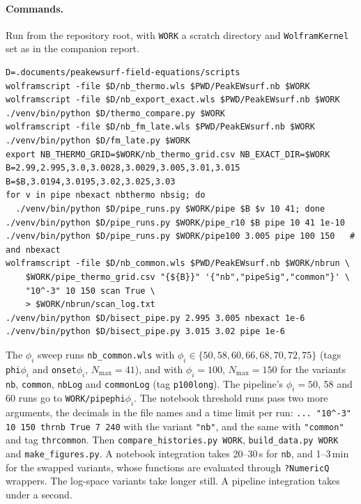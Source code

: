 \documentclass[11pt,a4paper]{article}
\newcommand{\code}[1]{\texttt{#1}}
\begin{document}
\paragraph{Commands.} Run from the repository root, with \code{WORK} a scratch directory and
\code{WolframKernel} set as in the companion report.
{\small
\begin{verbatim}
D=.documents/peakewsurf-field-equations/scripts
wolframscript -file $D/nb_thermo.wls $PWD/PeakEWsurf.nb $WORK
wolframscript -file $D/nb_export_exact.wls $PWD/PeakEWsurf.nb $WORK
./venv/bin/python $D/thermo_compare.py $WORK
wolframscript -file $D/nb_fm_late.wls $PWD/PeakEWsurf.nb $WORK
./venv/bin/python $D/fm_late.py $WORK
export NB_THERMO_GRID=$WORK/nb_thermo_grid.csv NB_EXACT_DIR=$WORK
B=2.99,2.995,3.0,3.0028,3.0029,3.005,3.01,3.015
B=$B,3.0194,3.0195,3.02,3.025,3.03
for v in pipe nbexact nbthermo nbsig; do
  ./venv/bin/python $D/pipe_runs.py $WORK/pipe $B $v 10 41; done
./venv/bin/python $D/pipe_runs.py $WORK/pipe_r10 $B pipe 10 41 1e-10
./venv/bin/python $D/pipe_runs.py $WORK/pipe100 3.005 pipe 100 150   # and nbexact
wolframscript -file $D/nb_common.wls $PWD/PeakEWsurf.nb $WORK/nbrun \
    $WORK/pipe_thermo_grid.csv "{${B}}" '{"nb","pipeSig","common"}' \
    "10^-3" 10 150 scan True \
    > $WORK/nbrun/scan_log.txt
./venv/bin/python $D/bisect_pipe.py 2.995 3.005 nbexact 1e-6
./venv/bin/python $D/bisect_pipe.py 3.015 3.02 pipe 1e-6
\end{verbatim}
}
\noindent The $\phi_i$ sweep runs \code{nb\_common.wls} with $\phi_i \in \{50, 58, 60, 66, 68,
70, 72, 75\}$ (tags \code{phi}$\phi_i$ and \code{onset}$\phi_i$, $N_{\max} = 41$), and with
$\phi_i = 100$, $N_{\max} = 150$ for the variants \code{nb}, \code{common}, \code{nbLog} and
\code{commonLog} (tag \code{p100long}). The pipeline's $\phi_i = 50$, 58 and $60$ runs go to
\code{WORK/pipephi}$\phi_i$. The notebook threshold runs pass two more arguments, the decimals in
the file names and a time limit per run: \code{... "10\^{}-3" 10 150 thrnb True 7 240} with the
variant \code{"nb"}, and the same with \code{"common"} and tag \code{thrcommon}. Then \code{compare\_histories.py WORK},
\code{build\_data.py WORK} and \code{make\_figures.py}. A notebook integration takes
20--30\,s for \code{nb}, and 1--3\,min for the swapped variants, whose functions are evaluated
through \code{?NumericQ} wrappers. The log-space variants take longer still. A pipeline
integration takes under a second.
\end{document}
